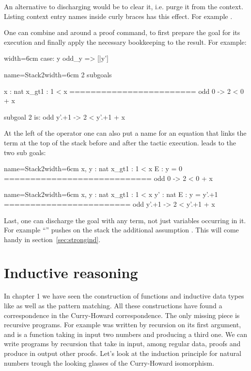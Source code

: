 An alternative to discharging  would be to clear it, i.e. purge it
from the context.  Listing context entry names inside curly braces has this
effect.  For example .

One can combine \C{:} and \C{=>} around a proof command, to first prepare the
goal for its execution and finally apply the necessary bookkeeping to the
result.  For example:

\begin{coq}{}{width=6cm}
case: y odd_y => [|y']
\end{coq}
\begin{coqout}{name=Stack2}{width=6cm}
2 subgoals

  x : nat
  x_gt1 : 1 < x
  ========================
   odd 0 -> 2 < 0 + x

subgoal 2 is:
 odd y'.+1 -> 2 < y'.+1 + x
\end{coqout}

At the left of the \C{:} operator one can also put a name for an
equation that links the term at the top of the stack before and
after the tactic execution.   leads to
the two sub goals:

\begin{coqout}{name=Stack2}{width=6cm}
 x, y : nat
 x_gt1 : 1 < x
 E : y = 0
============================
 odd 0 -> 2 < 0 + x
\end{coqout}
\begin{coqout}{name=Stack2}{width=6cm}
 x, y : nat
 x_gt1 : 1 < x
 y' : nat
 E : y = y'.+1
========================
 odd y'.+1 -> 2 < y'.+1 + x
\end{coqout}

Last, one can discharge the goal with any term, not
just variables occurring in it.  For example
``'' pushes on the stack
the additional assumption .  This
will come handy in section~\ref{sec:strongind}.

\section{Inductive reasoning}\label{sec:indreason}

In chapter 1 we have seen the  construction of functions and inductive
data types like  as well as the pattern matching.  All these
constructions have found a correspondence in the Curry-Howard correspondence.
The only missing piece is recursive programs.  For example
 was written by recursion on its first argument, and is a
function taking in input two numbers and producing a third one.
We can write programs by recursion that take in input, among regular  data,
proofs and produce in output other proofs.  Let's look at the
induction principle for natural numbers trough the looking glasses of the
Curry-Howard isomorphism.

